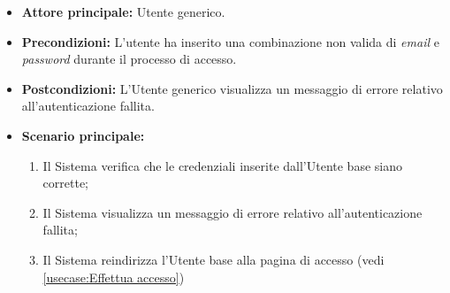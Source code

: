 \label{usecase:Accesso fallito}

\begin{itemize}
	\item \textbf{Attore principale:} Utente generico.
	\item \textbf{Precondizioni:}
    L'utente ha inserito una combinazione non valida di \textit{email} e \textit{password} durante il processo di accesso.
	\item \textbf{Postcondizioni:} L'Utente generico visualizza un messaggio di errore relativo all'autenticazione fallita.

	\item \textbf{Scenario principale:}
	\begin{enumerate}
        \item Il Sistema verifica che le credenziali inserite dall'Utente base siano corrette;
        \item Il Sistema visualizza un messaggio di errore relativo all'autenticazione fallita;
        \item Il Sistema reindirizza l'Utente base alla pagina di accesso (vedi \autoref{usecase:Effettua accesso})
    \end{enumerate}
	
\end{itemize}